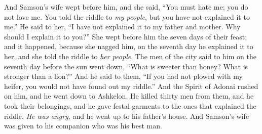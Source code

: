 \begin{biblechapter}
\verse And Samson’s wife wept before him, and she said, “You must hate me; you do not love me. You told the riddle to \textit{my people}, but you have not explained it to me.” He said to her, “I have not explained it to my father and mother. Why should I explain it to you?”
\verse She wept before him the seven days of their feast; and it happened, because she nagged him, on the seventh day he explained it to her, and she told the riddle to \textit{her people}.
\verse The men of the city said to him on the seventh day before the sun went down, “What is sweeter than honey? 
What is stronger than a lion?” And he said to them, “If you had not plowed with my heifer, 
you would not have found out my riddle.”
\verse And the Spirit of Adonai rushed on him, and he went down to Ashkelon. He killed thirty men from them, and he took their belongings, and he gave festal garments to the ones that explained the riddle. \textit{He was angry}, and he went up to his father’s house.
\verse And Samson’s wife was given to his companion who was his best man.
\end{biblechapter}

